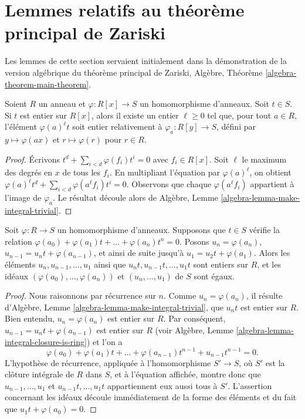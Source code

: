 \section{Lemmes relatifs au th\'eor\`eme principal de Zariski}
\label{section-ZMT}

\noindent
Les lemmes de cette section servaient initialement dans la d\'emonstration de
la version alg\'ebrique du th\'eor\`eme principal de Zariski,
Alg\`ebre, Th\'eor\`eme \ref{algebra-theorem-main-theorem}.

\begin{lemma}
\label{lemma-change-equation-multiply}
Soient $R$ un anneau et $\varphi : R[x] \to S$ un homomorphisme
d'anneaux. Soit $t \in S$. Si $t$ est entier sur
$R[x]$, alors il existe un entier $\ell \geq 0$ tel que,
pour tout $a \in R$, l'\'el\'ement $\varphi(a)^\ell t$
soit entier relativement \`a $\varphi_a : R[y] \to S$, d\'efini par
$y \mapsto \varphi(ax)$ et $r \mapsto \varphi(r)$
pour $r\in R$.
\end{lemma}

\begin{proof}
\'Ecrivons $t^d + \sum_{i < d} \varphi(f_i)t^i = 0$
avec $f_i \in R[x]$. Soit $\ell$ le maximum des degr\'es
en $x$ de tous les $f_i$. En multipliant l'\'equation
par $\varphi(a)^\ell$, on obtient
$\varphi(a)^\ell t^d + \sum_{i < d} \varphi(a^\ell f_i)t^i = 0$.
Observons que chaque $\varphi(a^\ell f_i)$ appartient \`a l'image de
$\varphi_a$. Le r\'esultat d\'ecoule alors de
Alg\`ebre, Lemme \ref{algebra-lemma-make-integral-trivial}.
\end{proof}

\begin{lemma}
\label{lemma-make-integral-less-trivial}
Soit $\varphi : R \to S$ un homomorphisme d'anneaux.
Supposons que $t \in S$ v\'erifie la
relation $\varphi(a_0) + \varphi(a_1)t + \ldots + \varphi(a_n) t^n = 0$.
Posons $u_n = \varphi(a_n)$, $u_{n-1} = u_n t + \varphi(a_{n-1})$,
et ainsi de suite jusqu'\`a $u_1 = u_2 t + \varphi(a_1)$.
Alors les \'el\'ements $u_n, u_{n-1}, \ldots, u_1$ ainsi que
$u_nt, u_{n-1}t, \ldots, u_1t$ sont entiers sur $R$,
et les id\'eaux $(\varphi(a_0), \ldots, \varphi(a_n))$ et
$(u_n, \ldots, u_1)$ de $S$ sont \'egaux.
\end{lemma}

\begin{proof}
Nous raisonnons par r\'ecurrence sur $n$. Comme $u_n = \varphi(a_n)$,
il r\'esulte d'Alg\`ebre, Lemme \ref{algebra-lemma-make-integral-trivial},
que $u_nt$ est entier sur $R$. Bien entendu,
$u_n = \varphi(a_n)$ est entier sur $R$. Par cons\'equent,
$u_{n - 1} = u_n t  + \varphi(a_{n - 1})$ est entier sur $R$ (voir
Alg\`ebre, Lemme \ref{algebra-lemma-integral-closure-is-ring})
et l'on a
$$
\varphi(a_0) + \varphi(a_1)t + \ldots + \varphi(a_{n - 1})t^{n - 1} +
u_{n - 1}t^{n - 1} = 0.
$$
L'hypoth\`ese de r\'ecurrence, appliqu\'ee \`a l'homomorphisme
$S' \to S$, o\`u $S'$ est la cl\^oture int\'egrale de $R$ dans $S$,
et \`a l'\'equation affich\'ee, montre donc que
$u_{n-1}, \ldots, u_1$ et $u_{n-1}t, \ldots, u_1t$
appartiennent eux aussi tous \`a $S'$. L'assertion concernant les id\'eaux
d\'ecoule imm\'ediatement de la forme des \'el\'ements et du fait que
$u_1t + \varphi(a_0) = 0$.
\end{proof}

